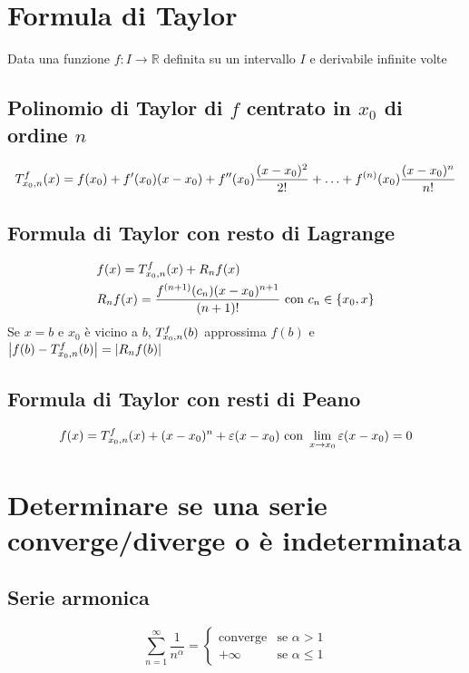 \documentclass[12pt, a4paper]{article}
\begin{document}
\section{Formula di Taylor}
    Data una funzione $f:I\rightarrow\mathbb{R}$ definita su un intervallo $I$ e derivabile infinite volte
    \subsection{Polinomio di Taylor di $f$ centrato in $x_0$ di ordine $n$}
        \begin{equation*}
            \taylor{f}{x_0}{n}(x) = f(x_0)+f'(x_0)(x-x_0)+f''(x_0)\frac{(x-x_0)^2}{2!}+\ldots+f^{(n)}(x_0)\frac{(x-x_0)^n}{n!}
        \end{equation*}
    \subsection{Formula di Taylor con resto di Lagrange}
        \begin{equation*}
            \begin{split}
                &f(x) = \taylor{f}{x_0}{n}(x) + R_nf(x)\\
                &R_nf(x) = \frac{f^{(n+1)}(c_n)(x-x_0)^{n+1}}{(n+1)!} \text{ con } c_n\in\{x_0,x\}
            \end{split}
        \end{equation*}
        Se $x=b$ e $x_0$ è vicino a $b$, $\taylor{f}{x_0}{n}(b)$ approssima $f(b)$ e $\left|f(b)-\taylor{f}{x_0}{n}(b)\right| = \left|R_nf(b)\right|$
    \subsection{Formula di Taylor con resti di Peano}
        \begin{equation*}
                f(x)= \taylor{f}{x_0}{n}(x) + (x-x_0)^n + \varepsilon(x-x_0) \text{ con } \lim_{x\rightarrow x_0} \varepsilon(x-x_0) = 0
        \end{equation*}
\section{Determinare se una serie converge/diverge o è indeterminata}
    \subsection{Serie armonica}
        \begin{equation*}
            \sum_{n=1}^{\infty}\frac{1}{n^\alpha} = \begin{cases}
                \text{converge} & \text{se }\alpha > 1\\
                +\infty & \text{se }\alpha\leq 1
            \end{cases}
        \end{equation*}
\end{document}
